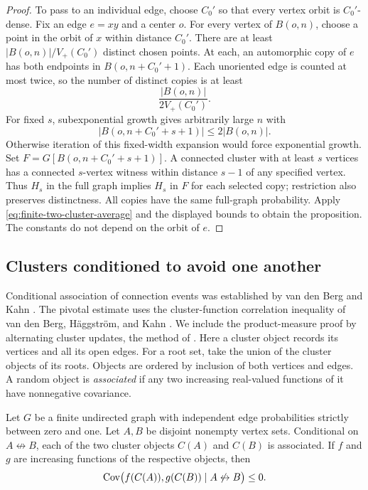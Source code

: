 \begin{proof}
To pass to an individual edge, choose $C_0'$ so that every vertex orbit
is $C_0'$-dense. Fix an edge $e=xy$ and a center $o$. For every vertex
of $B(o,n)$, choose a point in the orbit of $x$ within distance $C_0'$.
There are at least $|B(o,n)|/V_+(C_0')$ distinct chosen points. At each,
an automorphic copy of $e$ has both endpoints in $B(o,n+C_0'+1)$.
Each unoriented edge is counted at most twice, so the number of distinct
copies is at least
\[
 \frac{|B(o,n)|}{2V_+(C_0')}.
\]
For fixed $s$, subexponential growth gives arbitrarily large $n$ with
\[
 |B(o,n+C_0'+s+1)|\le2|B(o,n)|.
\]
Otherwise iteration of this fixed-width expansion would force
exponential growth. Set $F=G[B(o,n+C_0'+s+1)]$. A connected cluster
with at least $s$ vertices has a connected $s$-vertex witness within
distance $s-1$ of any specified vertex. Thus $H_s$ in the full graph
implies $H_s$ in $F$ for each selected copy; restriction also preserves
distinctness. All copies have the same full-graph probability.
Apply \eqref{eq:finite-two-cluster-average} and the displayed bounds
to obtain the proposition. The constants do not depend on the orbit
of $e$.
\end{proof}

\subsection{Clusters conditioned to avoid one another}

Conditional association of connection events was established by
van den Berg and Kahn \cite{VanDenBergKahn2001}.
The pivotal estimate uses the cluster-function correlation inequality of
van den Berg, H\"aggstr\"om, and Kahn
\cite[Theorems~1.3 and~1.4]{VanDenBergHaggstromKahn2006}. We include the
product-measure proof by alternating cluster updates, the method of
\cite[Section~2.1]{VanDenBergHaggstromKahn2006}.
Here a cluster object records its vertices and all its open edges.
For a root set, take the union of the cluster objects of its roots.
Objects are ordered by inclusion of both vertices and edges.
A random object is \emph{associated} if any two increasing real-valued
functions of it have nonnegative covariance.

\begin{lemma}\label{lem:avoidance}
Let $G$ be a finite undirected graph with independent edge probabilities
strictly between zero and one. Let $A,B$ be disjoint nonempty vertex
sets. Conditional on $A\not\leftrightarrow B$, each of the two cluster
objects $C(A)$ and $C(B)$ is associated. If $f$ and $g$ are increasing
functions of the respective objects, then
\[
 \operatorname{Cov}\bigl(f(C(A)),g(C(B))\mid A\not\leftrightarrow B\bigr)\le0.
\]
\end{lemma}


